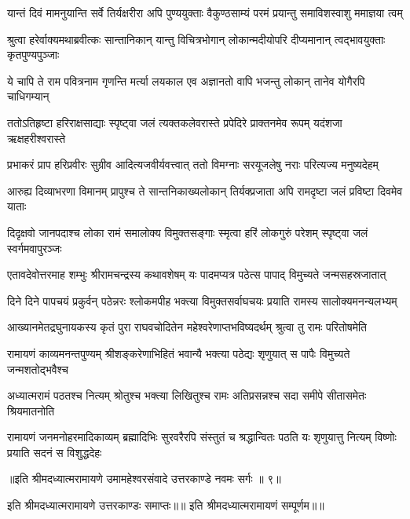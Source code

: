 \fourlineindentedshloka
{यान्तं दिवं मामनुयान्ति सर्वे}
{तिर्यक्षरीरा अपि पुण्ययुक्ताः}
{वैकुण्ठसाम्यं परमं प्रयान्तु}
{समाविशस्वाशु ममाज्ञया त्वम्} %

\fourlineindentedshloka
{श्रुत्वा हरेर्वाक्यमथाब्रवीत्कः}
{सान्तानिकान् यान्तु विचित्रभोगान्}
{लोकान्मदीयोपरि दीप्यमानान्}
{त्वद्भावयुक्ताः कृतपुण्यपुञ्जाः} %

\fourlineindentedshloka
{ये चापि ते राम पवित्रनाम}
{गृणन्ति मर्त्या लयकाल एव}
{अज्ञानतो वापि भजन्तु लोकान्}
{तानेव योगैरपि चाधिगम्यान्} %

\fourlineindentedshloka
{ततोऽतिहृष्टा हरिराक्षसाद्याः}
{स्पृष्ट्वा जलं त्यक्तकलेवरास्ते}
{प्रपेदिरे प्राक्तनमेव रूपम्}
{यदंशजा ऋक्षहरीश्वरास्ते} %

\fourlineindentedshloka
{प्रभाकरं प्राप हरिप्रवीरः}
{सुग्रीव आदित्यजवीर्यवत्त्वात्}
{ततो विमग्नाः सरयूजलेषु}
{नराः परित्यज्य मनुष्यदेहम्} %

\fourlineindentedshloka
{आरुह्य दिव्याभरणा विमानम्}
{प्रापुश्च ते सान्तनिकाख्यलोकान्}
{तिर्यक्प्रजाता अपि रामदृष्टा}
{जलं प्रविष्टा दिवमेव याताः} %

\fourlineindentedshloka
{दिदृक्षवो जानपदाश्च लोका}
{रामं समालोक्य विमुक्तसङ्गाः}
{स्मृत्वा हरिं लोकगुरुं परेशम्}
{स्पृष्ट्वा जलं स्वर्गमवापुरञ्जः} %

\fourlineindentedshloka
{एतावदेवोत्तरमाह शम्भुः}
{श्रीरामचन्द्रस्य कथावशेषम्}
{यः पादमप्यत्र पठेत्स पापाद्\-}
{विमुच्यते जन्मसहस्रजातात्} %

\fourlineindentedshloka
{दिने दिने पापचयं प्रकुर्वन्}
{पठेन्नरः श्लोकमपीह भक्त्या}
{विमुक्तसर्वाघचयः प्रयाति}
{रामस्य सालोक्यमनन्यलभ्यम्} %

\fourlineindentedshloka
{आख्यानमेतद्रघुनायकस्य}
{कृतं पुरा राघवचोदितेन}
{महेश्वरेणाप्तभविष्यदर्थम्}
{श्रुत्वा तु रामः परितोषमेति} %

\fourlineindentedshloka
{रामायणं काव्यमनन्तपुण्यम्}
{श्रीशङ्करेणाभिहितं भवान्यै}
{भक्त्या पठेद्यः शृणुयात् स पापैः}
{विमुच्यते जन्मशतोद्भवैश्च} %

\fourlineindentedshloka
{अध्यात्मरामं पठतश्च नित्यम्}
{श्रोतुश्च भक्त्या लिखितुश्च रामः}
{अतिप्रसन्नश्च सदा समीपे}
{सीतासमेतः श्रियमातनोति} %

\fourlineindentedshloka
{रामायणं जनमनोहरमादिकाव्यम्}
{ब्रह्मादिभिः सुरवरैरपि संस्तुतं च}
{श्रद्धान्वितः पठति यः शृणुयात्तु नित्यम्}
{विष्णोः प्रयाति सदनं स विशुद्धदेहः} %

{॥इति श्रीमदध्यात्मरामायणे उमामहेश्वरसंवादे
उत्तरकाण्डे नवमः सर्गः ॥ ९॥
}

इति श्रीमदध्यात्मरामायणे उत्तरकाण्डः समाप्तः॥॥
इति श्रीमदध्यात्मरामायणं सम्पूर्णम॥॥
